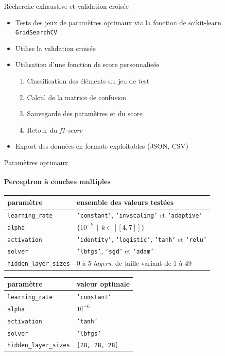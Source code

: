 \documentclass{beamer}
\begin{document}
\begin{frame}{Recherche exhaustive et validation croisée}
\begin{itemize}
\item Tests des jeux de paramètres optimaux via la fonction de scikit-learn \texttt{GridSearchCV}
\item Utilise la validation croisée
\item Utilisation d'une fonction de score personnalisée \begin{enumerate}
\item Classification des éléments du jeu de test
\item Calcul de la matrice de confusion
\item Sauvegarde des paramètres et du score
\item Retour du \emph{f1-score}
\end{enumerate}
\item Export des données en formats exploitables (JSON, CSV)
\end{itemize}
\end{frame}

\begin{frame}{Paramètres optimaux}
\framesubtitle{Perceptron à couches multiples}

\begin{table}
\tiny
\centering
\begin{tabular}{l l}
paramètre & ensemble des valeurs testées \\
\hline
\texttt{learning\_rate} & \texttt{'constant'}, \texttt{'invscaling'} et \texttt{'adaptive'}\\
\texttt{alpha} & $\{10^{-k} \>\> | \>\> k \in [\![4, 7]\!] \}$ \\
\texttt{activation} & \texttt{'identity'}, \texttt{'logistic'}, \texttt{'tanh'} et \texttt{'relu'}\\
\texttt{solver} &\texttt{'lbfgs'}, \texttt{'sgd'} et \texttt{'adam'} \\
\texttt{hidden\_layer\_sizes} & 0 à 5 \emph{layers}, de taille variant de 1 à 49 \\
\end{tabular}
\end{table}

\begin{table}
\centering
\begin{tabular}{l l}
paramètre & valeur optimale \\
\hline
\texttt{learning\_rate} & \texttt{'constant'}\\
\texttt{alpha} & $10^{-6}$ \\
\texttt{activation} & \texttt{'tanh'}\\
\texttt{solver} & \texttt{'lbfgs'}\\
\texttt{hidden\_layer\_sizes} & \texttt{[28, 28, 28]}\\
\end{tabular}
\end{table}

\end{frame}
\end{document}
